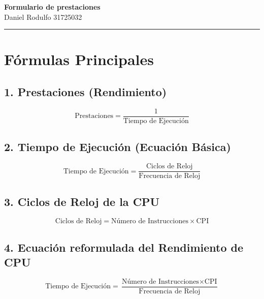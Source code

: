 \documentclass[11pt,a4paper]{article}
\begin{document}
\begin{center}
    {\color{primary}\LARGE\bfseries Formulario de prestaciones} \\[0.2cm]
    {\color{secondary}\large Daniel Rodulfo 31725032} \\[0.4cm]
    \rule{\linewidth}{0.5mm}
\end{center}

\vspace{0.5cm}

\section{Fórmulas Principales}


\subsection{1. Prestaciones (Rendimiento)}
\begin{equation}
    \text{Prestaciones} = \frac{1}{\text{Tiempo de Ejecución}}
\end{equation}

\subsection{2. Tiempo de Ejecución (Ecuación Básica)}
\begin{equation}
    \text{Tiempo de Ejecución} = \frac{\text{Ciclos de Reloj}}{\text{Frecuencia de Reloj}}
\end{equation}

\subsection{3. Ciclos de Reloj de la CPU}
\begin{equation}
    \text{Ciclos de Reloj} = \text{Número de Instrucciones} \times \text{CPI}
\end{equation}

\subsection{4. Ecuación reformulada del Rendimiento de CPU}

\begin{equation}
    \text{Tiempo de Ejecución} = \frac{\text{Número de Instrucciones} \times \text{CPI}}{\text{Frecuencia de Reloj}}
\end{equation}

\vspace{0.5cm}
\end{document}
